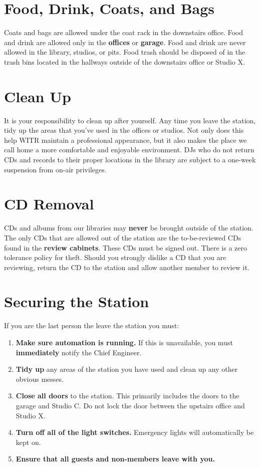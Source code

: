 \documentclass{witrman}
\begin{document}
\section{Food, Drink, Coats, and Bags}
Coats and bags are allowed under the coat rack in the downstairs office. Food
and drink are allowed only in the \textbf{offices} or \textbf{garage}. Food and
drink are never allowed in the library, studios, or pits. Food trash should be
disposed of in the trash bins located in the hallways outside of the downstairs
office or Studio X.

\section{Clean Up}
It is your responsibility to clean up after yourself. Any time you leave the
station, tidy up the areas that you've used in the offices or studios. Not only
does this help WITR maintain a professional appearance, but it also makes the
place we call home a more comfortable and enjoyable environment. DJs who do not
return CDs and records to their proper locations in the library are subject to a
one-week suspension from on-air privileges.

\section{CD Removal}
CDs and albums from our libraries may \textbf{never} be brought outside of the
station.  The only CDs that are allowed out of the station are the
to-be-reviewed CDs found in the \textbf{review cabinets}. These CDs must be
signed out.  There is a zero tolerance policy for theft. Should you strongly
dislike a CD that you are reviewing, return the CD to the station and allow
another member to review it.

\section{Securing the Station}
If you are the last person the leave the station you must:
\begin{enumerate}
    \item \textbf{Make sure automation is running.} If this is unavailable, you
        must \textbf{immediately} notify the Chief Engineer.
    \item \textbf{Tidy up} any areas of the station you have used and clean up
        any other obvious messes.
    \item \textbf{Close all doors} to the station. This primarily includes the
        doors to the garage and Studio C. Do not lock the door between the
        upstairs office and Studio X.
    \item \textbf{Turn off all of the light switches.} Emergency lights will
        automatically be kept on.
    \item \textbf{Ensure that all guests and non-members leave with you.}
\end{enumerate}
\end{document}
